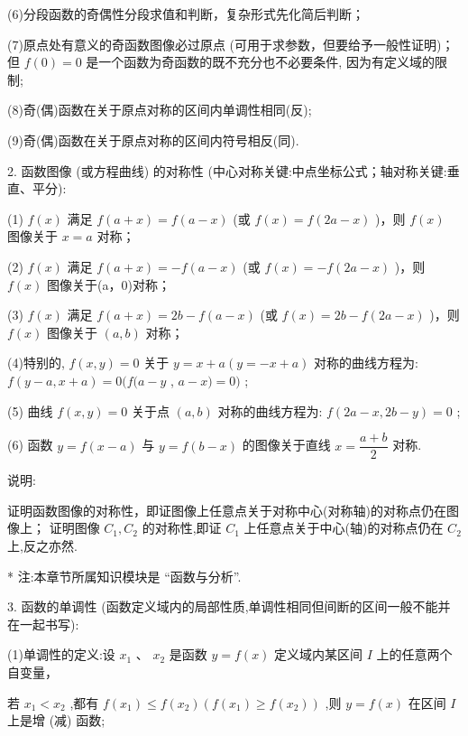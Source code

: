 (6)分段函数的奇偶性分段求值和判断，复杂形式先化简后判断；

(7)原点处有意义的奇函数图像必过原点 (可用于求参数，但要给予一般性证明)；但 $f\left( 0\right)  = 0$ 是一个函数为奇函数的既不充分也不必要条件, 因为有定义域的限制;

(8)奇(偶)函数在关于原点对称的区间内单调性相同(反);

(9)奇(偶)函数在关于原点对称的区间内符号相反(同).

2. 函数图像 (或方程曲线) 的对称性 (中心对称关键:中点坐标公式；轴对称关键:垂直、平分):

(1) $f\left( x\right)$ 满足 $f\left( {a + x}\right)  = f\left( {a - x}\right)$ (或 $f\left( x\right)  = f\left( {{2a} - x}\right)$ )，则 $f\left( x\right)$ 图像关于 $x = a$ 对称；

(2) $f\left( x\right)$ 满足 $f\left( {a + x}\right)  =  - f\left( {a - x}\right)$ (或 $f\left( x\right)  =  - f\left( {{2a} - x}\right)$ )，则 $f\left( x\right)$ 图像关于(a，0)对称；

(3) $f\left( x\right)$ 满足 $f\left( {a + x}\right)  = {2b} - f\left( {a - x}\right)$ (或 $f\left( x\right)  = {2b} - f\left( {{2a} - x}\right)$ )，则 $f\left( x\right)$ 图像关于 $\left( {a,b}\right)$ 对称；

(4)特别的, $f\left( {x,y}\right)  = 0$ 关于 $y = x + a\left( {y =  - x + a}\right)$ 对称的曲线方程为: $f\left( {y - a,x + a}\right)  = 0(f(a - y$ , $a - x) = 0)$ ;

(5) 曲线 $f\left( {x,y}\right)  = 0$ 关于点 $\left( {a,b}\right)$ 对称的曲线方程为: $f\left( {{2a} - x,{2b} - y}\right)  = 0$ ;

(6) 函数 $y = f\left( {x - a}\right)$ 与 $y = f\left( {b - x}\right)$ 的图像关于直线 $x = \dfrac{a + b}{2}$ 对称.

说明:

  证明函数图像的对称性，即证图像上任意点关于对称中心(对称轴)的对称点仍在图像上；  证明图像 ${C}_{1},{C}_{2}$ 的对称性,即证 ${C}_{1}$ 上任意点关于中心(轴)的对称点仍在 ${C}_{2}$ 上,反之亦然.



* 注:本章节所属知识模块是 “函数与分析”.



3. 函数的单调性 (函数定义域内的局部性质,单调性相同但间断的区间一般不能并在一起书写):

(1)单调性的定义:设 ${x}_{1}$ 、 ${x}_{2}$ 是函数 $y = f\left( x\right)$ 定义域内某区间 $I$ 上的任意两个自变量，

若 ${x}_{1} < {x}_{2}$ ,都有 $f\left( {x}_{1}\right)  \leq  f\left( {x}_{2}\right) \left( {f\left( {x}_{1}\right)  \geq  f\left( {x}_{2}\right) }\right)$ ,则 $y = f\left( x\right)$ 在区间 $I$ 上是增 (减) 函数;


